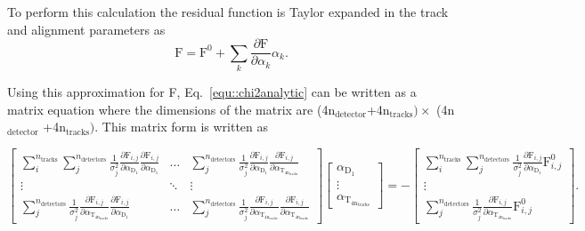 \noindent
To perform this calculation the residual function is Taylor expanded in the
track and alignment parameters as
\begin{equation}
\mathrm{F} = \mathrm{F}^0 + \sum_k \frac{\partial \mathrm{F}}{\partial
  \alpha_k}\alpha_k.
\end{equation}

\noindent
Using this approximation for F, Eq.~\ref{equ::chi2analytic} can be written as a
matrix equation where the dimensions of the matrix are
(4n$_{\mathrm{detector}}$+4n$_{\mathrm{tracks}})\times$
(4n$_{\mathrm{detector}}$ +4n$_{\mathrm{tracks}})$.  This matrix form is written
as

\begin{dmath}
  \begin{bmatrix}
    \sum_i^{n_{\mathrm{tracks}}} \sum_j^{n_{\mathrm{detectors}}}
      \frac{1}{\sigma^2_j} \frac{\partial \mathrm{F}_{i,j}}{\partial
        \alpha_{\mathrm{D_1}}}\frac{\partial \mathrm{F}_{i,j}}{\partial
        \alpha_{\mathrm{D_1}}}
      & \dots &
      \sum_j^{n_{\mathrm{detectors}}}
      \frac{1}{\sigma^2_j}\frac{\partial \mathrm{F}_{i,j}}{\partial
        \alpha_{\mathrm{D_1}}}\frac{\partial \mathrm{F}_{i,j}}{\partial
        \alpha_{\mathrm{T_{4\mathrm{n}_{\mathrm{tracks}}}}}} \\
      \vdots & \ddots & \vdots \\
      \sum_j^{n_{\mathrm{detectors}}}
      \frac{1}{\sigma^2_j}\frac{\partial \mathrm{F}_{i,j}}{\partial
        \alpha_{\mathrm{T_{4\mathrm{n}_{\mathrm{tracks}}}}}}\frac{\partial
        \mathrm{F}_{i,j}}{\partial \alpha_{\mathrm{D_1}}} & \dots &
      \sum_j^{n_{\mathrm{detectors}}} \frac{1}{\sigma^2_j}\frac{\partial
        \mathrm{F}_{i,j}}{\partial
        \alpha_{\mathrm{T_{4\mathrm{n}_{\mathrm{tracks}}}}}}\frac{\partial
        \mathrm{F}_{i,j}}{\partial
        \alpha_{\mathrm{T_{4\mathrm{n}_{\mathrm{tracks}}}}}}
  \end{bmatrix}
  \begin{bmatrix}
    \alpha_{\mathrm{D_1}} \\
    \vdots \\
    \alpha_{\mathrm{T_{4\mathrm{n}_{\mathrm{tracks}}}}}
  \end{bmatrix}
  = -
  \begin{bmatrix}
    \sum_i^{n_{\mathrm{tracks}}} \sum_j^{n_{\mathrm{detectors}}}
      \frac{1}{\sigma^2_j}\frac{\partial \mathrm{F}_{i,j}}{\partial
        \alpha_{\mathrm{D_1}}} \mathrm{F}_{i,j}^0 \\
      \vdots \\
      \sum_j^{n_{\mathrm{detectors}}}
    \frac{1}{\sigma^2_j}\frac{\partial \mathrm{F}_{i,j}}{\partial
      \alpha_{\mathrm{T_{4\mathrm{n}_{\mathrm{tracks}}}}}} \mathrm{F}_{i,j}^0
  \end{bmatrix}.
  \label{equ::aliMatrix}
\end{dmath}    

